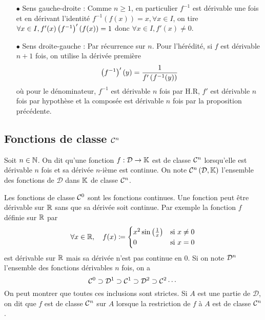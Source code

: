 \documentclass{magnolia}
\begin{document}
\begin{preuve}
  \begin{itemize}
  \item[$\bullet$] Sens gauche-droite : Comme $n\geq 1$, en particulier $f^{-1}$ est dérivable une fois et en dérivant l'identité $f^{-1}(f(x))=x, \forall x \in I$, on tire $\forall x \in I, f'(x)\left(f^{-1}\right)'(f(x))=1$ donc $\forall x \in I, f'(x)\neq 0$.
  \item[$\bullet$] Sens droite-gauche : Par récurrence sur $n$. Pour l'hérédité, si $f$ est dérivable $n+1$ fois, on utilise la dérivée première $$\left(f^{-1}\right)'(y)=\frac{1}{f'\left(f^{-1}(y)\right)}$$ où pour le dénominateur, $f^{-1}$ est dérivable $n$ fois par H.R, $f'$ est dérivable $n$ fois par hypothèse et la composée est dérivable $n$ fois par la proposition précédente. 
  \end{itemize}
  \end{preuve}


\subsection{Fonctions de classe $\mathcal{C}^{n}$}

\begin{definition}[utile=-3]
Soit $n\in\mathbb{N}$. On dit qu'une fonction $f:\mathcal{D}\to\mathbb{K}$ est de classe $\mathcal{C}^{n}$
lorsqu'elle est dérivable $n$ fois et sa dérivée $n$-ième est continue. On note
$\mathcal{C}^{n}\left(\mathcal{D},\mathbb{K}\right)$  l'ensemble des fonctions de $\mathcal{D}$
dans $\mathbb{K}$ de classe $\mathcal{C}^{n}$.
\end{definition}

\begin{remarques}
\remarque Les fonctions de classe $\mathcal{C}^{0}$ sont les fonctions continues.
\remarque Une fonction peut être dérivable sur $\mathbb{R}$ sans que sa dérivée soit
  continue. Par exemple la fonction $f$ définie sur $\mathbb{R}$ par
  \[\forall x\in\mathbb{R} ,\quad f(x)\coloneqq
    \begin{cases}
    x^2\sin\left(\frac{1}{x}\right) & \text{si $x\neq 0$}\\
    0 & \text{si $x=0$}
    \end{cases}\]
  est dérivable sur $\mathbb{R}$ mais sa dérivée n'est pas continue en 0.
\remarque Si on note $\mathcal{D}^{n}$ l'ensemble des fonctions dérivables $n$
  fois, on a
  \[\mathcal{C}^{0} \supset \mathcal{D}^{1} \supset \mathcal{C}^{1} \supset \mathcal{D}^{2}
    \supset \mathcal{C}^{2} \cdots \]
  On peut montrer que toutes ces inclusions sont strictes.
\remarque Si $A$ est une partie de $\mathcal{D}$, on dit que $f$ est de
  classe $\mathcal{C}^{n}$ sur $A$ lorsque la restriction de $f$ à $A$
  est de classe $\mathcal{C}^{n}$.
\end{remarques}
\end{document}
